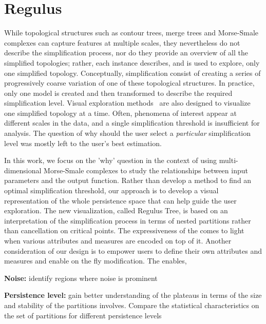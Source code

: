 \section{Regulus}
\label{sec:motivation}

While topological structures such as contour trees, merge trees and Morse-Smale complexes 
can capture features at multiple scales,
they nevertheless do not describe the simplification process, nor do they provide an overview of all the simplified topologies; rather, each instance describes, and is used to explore, only one simplified topology. Conceptually, simplification consist of creating a series of progressively coarse variation of one of these topological structures. In practice, only one model is created and then transformed to describe the required simplification level.
Visual exploration methods~\cite{Gerber10, maljovec16} are also designed to visualize one simplified topology at a time. Often, phenomena of interest appear at different scales in the data, and a single simplification threshold is insufficient for analysis.
The question of why should the user select a \textit{particular} simplification level was mostly left to the user's best estimation. 

In this work, we focus on the 'why' question in the context of using multi-dimensional Morse-Smale complexes  to study the relationships between input parameters and the output function. Rather than develop a method to find an optimal simplification threshold, our approach is to develop a visual representation of the whole persistence space that can help guide the user exploration. The new visualization, called Regulus Tree, is based on an interpretation of the simplification process in terms of nested partitions rather than cancellation on critical points. The expressiveness of the \RT comes to light when various attributes and measures are encoded on top of it. Another consideration of our design is to empower users to define their own attributes and measures and enable on the fly modification. The \RT enables,

    \noindent \textbf{Noise:} identify regions where noise is prominent
    
    \noindent  \textbf{Persistence level:} gain better understanding of the plateaus in terms of the size and stability of the partitions involves. Compare the statistical characteristics on the set of partitions for different persistence levels
    
